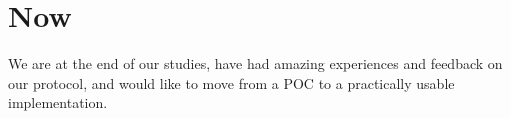 \section{Now}
We are at the end of our studies, have had amazing experiences and feedback on our protocol, and would like to move from a POC to a practically usable implementation.
